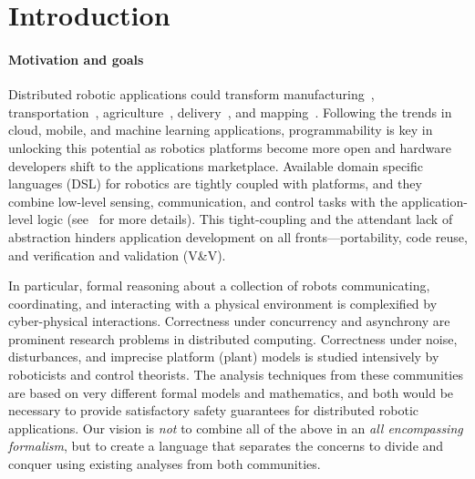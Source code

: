 \section{Introduction}
\label{sec:intro}

\paragraph{Motivation and goals}
Distributed robotic applications could transform manufacturing~\cite{pires2000object,gauthier1987interprocess}, transportation~\cite{gerla2014internet,guo2012autonomous}, agriculture~\cite{blender2016managing,r2018research}, delivery~\cite{mosterman2014heterogeneous}, and mapping~\cite{thrun2002robotic}.
Following the trends in cloud, mobile, and machine learning applications, programmability is key in unlocking this potential
as robotics platforms become more open and hardware developers shift to the applications marketplace.
Available domain specific languages (DSL) for robotics are tightly coupled with platforms,
and they combine low-level sensing, communication, and control tasks with the application-level logic
(see~ for more details).
This tight-coupling and the attendant lack of abstraction hinders application development on all fronts---portability, code reuse, and verification and validation (V\&V).

In particular, formal reasoning about a collection of robots communicating, coordinating, and interacting with a physical environment
is complexified by cyber-physical interactions.
Correctness under concurrency and asynchrony are prominent research problems in distributed computing. Correctness under noise, disturbances, and imprecise platform (plant) models is studied intensively by roboticists and control theorists. 
The analysis techniques from these communities are based on very different formal models and mathematics, and both would be necessary  to provide satisfactory safety guarantees for  distributed robotic applications.
Our vision is {\em not\/} to combine all of the above in an {\em all encompassing formalism\/}, but to create a language that separates  the concerns to divide and conquer using existing analyses from both communities.

